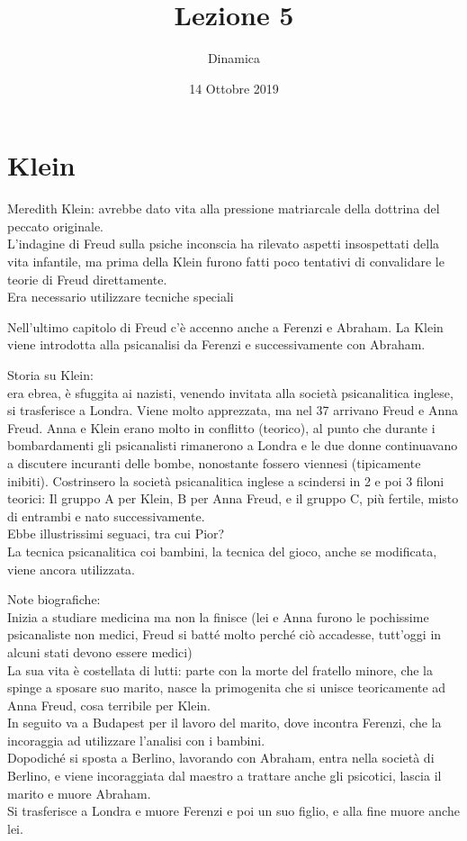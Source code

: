 \documentclass[
]{article}
\date{14 Ottobre 2019}
\title{Lezione 5}
\author{Dinamica}
\begin{document}
\maketitle

\section{Klein}
Meredith Klein: avrebbe dato vita alla pressione matriarcale della
dottrina del peccato originale.\\
L'indagine di Freud sulla psiche inconscia ha rilevato aspetti
insospettati della vita infantile, ma prima della Klein furono fatti
poco tentativi di convalidare le teorie di Freud direttamente.\\
Era necessario utilizzare tecniche speciali

Nell'ultimo capitolo di Freud c'è accenno anche a Ferenzi e Abraham. La
Klein viene introdotta alla psicanalisi da Ferenzi e successivamente con
Abraham.

Storia su Klein:\\
era ebrea, è sfuggita ai nazisti, venendo invitata alla società
psicanalitica inglese, si trasferisce a Londra. Viene molto apprezzata,
ma nel 37 arrivano Freud e Anna Freud. Anna e Klein erano molto in
conflitto (teorico), al punto che durante i bombardamenti gli
psicanalisti rimanerono a Londra e le due donne continuavano a discutere
incuranti delle bombe, nonostante fossero viennesi (tipicamente
inibiti). Costrinsero la società psicanalitica inglese a scindersi in 2
e poi 3 filoni teorici: Il gruppo A per Klein, B per Anna Freud, e il
gruppo C, più fertile, misto di entrambi e nato successivamente.\\
Ebbe illustrissimi seguaci, tra cui Pior?\\
La tecnica psicanalitica coi bambini, la tecnica del gioco, anche se
modificata, viene ancora utilizzata.

Note biografiche:\\
Inizia a studiare medicina ma non la finisce (lei e Anna furono le
pochissime psicanaliste non medici, Freud si batté molto perché ciò
accadesse, tutt'oggi in alcuni stati devono essere medici)\\
La sua vita è costellata di lutti: parte con la morte del fratello
minore, che la spinge a sposare suo marito, nasce la primogenita che si
unisce teoricamente ad Anna Freud, cosa terribile per Klein.\\
In seguito va a Budapest per il lavoro del marito, dove incontra
Ferenzi, che la incoraggia ad utilizzare l'analisi con i bambini.\\
Dopodiché si sposta a Berlino, lavorando con Abraham, entra nella
società di Berlino, e viene incoraggiata dal maestro a trattare anche
gli psicotici, lascia il marito e muore Abraham.\\
Si trasferisce a Londra e muore Ferenzi e poi un suo figlio, e alla fine
muore anche lei.
\end{document}
